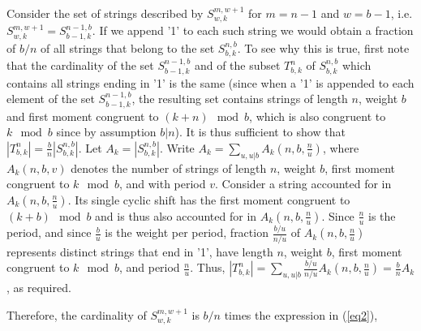 Consider the set of strings described by $S_{w,k}^{m,w+1}$ for
$m=n-1$ and $w=b-1$, i.e. $S_{w,k}^{m,w+1} = S_{b-1,k}^{n-1,b}$. If
we append '1' to each such string we would obtain a fraction of
$b/n$ of all strings that belong to the set
$S_{b,k}^{n,b}$. %
To see why this is true, first note that the cardinality of the set
$S_{b-1,k}^{n-1,b}$ and of the subset $T_{b,k}^n$ of $S_{b,k}^{n,b}$
which contains all strings ending in '1' is the same (since when a
'1' is appended to each element of the set $S_{b-1,k}^{n-1,b}$, the
resulting set contains strings of length $n$, weight $b$ and first
moment congruent to $(k+n) \mod b$, which is also congruent to $k
\mod b$ since by assumption $b | n$). It is thus sufficient to show
that $|T_{b,k}^n|=\frac{b}{n} |S_{b,k}^{n,b}|$. Let
$A_k=|S_{b,k}^{n,b}|$. Write $A_k=\sum_{u,u|b}
A_k(n,b,\frac{n}{u})$, where $A_k(n,b,v)$ denotes the number of
strings of length $n$, weight $b$, first moment congruent to $k \mod
b$, and with period $v$. Consider a string accounted for in
$A_k(n,b,\frac{n}{u})$. Its single cyclic shift has the first moment
congruent to $(k+b) \mod b$ and is thus also accounted for in
$A_k(n,b,\frac{n}{u})$. Since $\frac{n}{u}$ is the period, and since
$\frac{b}{u}$ is the weight per period, fraction $\frac{b/u}{n/u}$
of $A_k(n,b,\frac{n}{u})$ represents distinct strings that end in
'1', have length $n$, weight $b$, first moment congruent to $k \mod
b$, and period $\frac{n}{u}$. Thus,
 $|T_{b,k}^n|=\sum_{u,u|b} \frac{b/u}{n/u}
 A_k(n,b,\frac{n}{u})=\frac{b}{n}A_k$, as required.


Therefore, the cardinality of $S_{w,k}^{m,w+1}$ is $b/n$ times the
expression in (\ref{eq2}),

